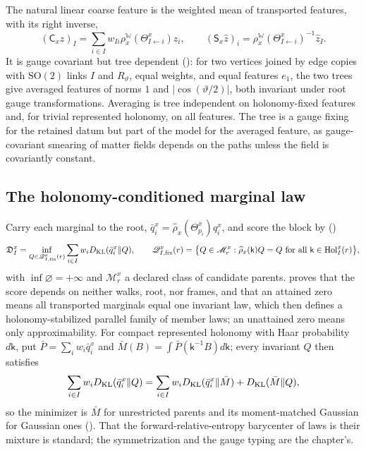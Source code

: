The natural linear coarse feature is the weighted mean of transported features, with its right
inverse,
\[
(\mathsf C_xz)_I=\sum_{i\in I}w_{Ii}\rho^{\mathbb W}_x(\Theta^x_{I\leftarrow i})z_i,
\qquad
(\mathsf S_x\hat z)_i=\rho^{\mathbb W}_x(\Theta^x_{I\leftarrow i})^{-1}\hat z_I.
\]
It is gauge covariant but tree dependent (): for two vertices joined by edge copies with
$\mathrm{SO}(2)$ links $I$ and $R_\vartheta$, equal weights, and equal features $e_1$, the two trees give
averaged features of norms $1$ and $\lvert\cos(\vartheta/2)\rvert$, both invariant under root gauge
transformations. Averaging is tree independent on holonomy-fixed features and, for trivial represented
holonomy, on all features. The tree is a gauge
fixing for the retained datum but part of the model for the averaged feature, as gauge-covariant smearing
of matter fields depends on the paths unless the field is covariantly constant.

\subsection{The holonomy-conditioned marginal law}

Carry each marginal to the root, $\bar q^x_i=\widehat\rho_x(\Theta^x_{p_i})q^x_i$, and score the block by
()
\[
\mathfrak D^x_I=\inf_{Q\in\mathscr Q^x_{I,\mathrm{fix}}(r)}\sum_{i\in I}w_iD_{\mathrm{KL}}(\bar q^x_i\Vert Q),
\qquad
\mathscr Q^x_{I,\mathrm{fix}}(r)=\bigl\{Q\in\mathscr M^x_r:\widehat\rho_x(\mathsf k)Q=Q\text{ for all }\mathsf k\in\mathrm{Hol}^x_I(r)\bigr\},
\]
with $\inf\varnothing=+\infty$ and $\mathscr M^x_r$ a declared class of candidate parents.
 proves that the score depends on neither walks, root, nor frames, and
that an attained zero means all transported marginals equal one invariant law, which then defines a
holonomy-stabilized parallel family of member laws; an unattained zero means only approximability. For
compact represented holonomy with Haar probability $d\mathsf k$, put $\bar P=\sum_iw_i\bar q^x_i$ and
$\bar M(B)=\int\bar P(\mathsf k^{-1}B)d\mathsf k$; every invariant $Q$ then satisfies
\[
\sum_{i\in I}w_iD_{\mathrm{KL}}(\bar q^x_i\Vert Q)=\sum_{i\in I}w_iD_{\mathrm{KL}}(\bar q^x_i\Vert\bar M)+D_{\mathrm{KL}}(\bar M\Vert Q),
\]
so the minimizer is $\bar M$ for unrestricted parents and its moment-matched Gaussian for Gaussian ones
(). That the forward-relative-entropy barycenter of laws is
their mixture is standard; the symmetrization and the gauge typing are the chapter's.

